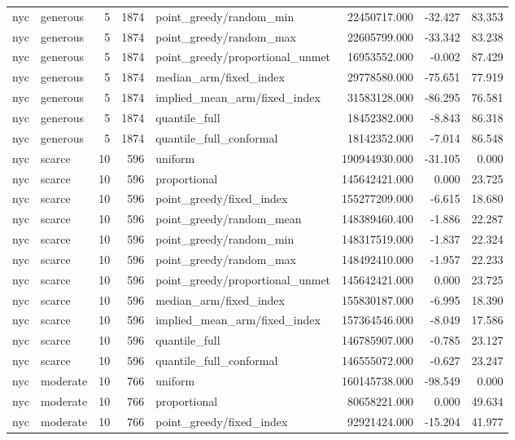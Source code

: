 \begin{tabular}{llrrlrrr}
nyc & generous & 5 & 1874 & point\_greedy/random\_min & 22450717.000 & -32.427 & 83.353 \\
nyc & generous & 5 & 1874 & point\_greedy/random\_max & 22605799.000 & -33.342 & 83.238 \\
nyc & generous & 5 & 1874 & point\_greedy/proportional\_unmet & 16953552.000 & -0.002 & 87.429 \\
nyc & generous & 5 & 1874 & median\_arm/fixed\_index & 29778580.000 & -75.651 & 77.919 \\
nyc & generous & 5 & 1874 & implied\_mean\_arm/fixed\_index & 31583128.000 & -86.295 & 76.581 \\
nyc & generous & 5 & 1874 & quantile\_full & 18452382.000 & -8.843 & 86.318 \\
nyc & generous & 5 & 1874 & quantile\_full\_conformal & 18142352.000 & -7.014 & 86.548 \\
nyc & scarce & 10 & 596 & uniform & 190944930.000 & -31.105 & 0.000 \\
nyc & scarce & 10 & 596 & proportional & 145642421.000 & 0.000 & 23.725 \\
nyc & scarce & 10 & 596 & point\_greedy/fixed\_index & 155277209.000 & -6.615 & 18.680 \\
nyc & scarce & 10 & 596 & point\_greedy/random\_mean & 148389460.400 & -1.886 & 22.287 \\
nyc & scarce & 10 & 596 & point\_greedy/random\_min & 148317519.000 & -1.837 & 22.324 \\
nyc & scarce & 10 & 596 & point\_greedy/random\_max & 148492410.000 & -1.957 & 22.233 \\
nyc & scarce & 10 & 596 & point\_greedy/proportional\_unmet & 145642421.000 & 0.000 & 23.725 \\
nyc & scarce & 10 & 596 & median\_arm/fixed\_index & 155830187.000 & -6.995 & 18.390 \\
nyc & scarce & 10 & 596 & implied\_mean\_arm/fixed\_index & 157364546.000 & -8.049 & 17.586 \\
nyc & scarce & 10 & 596 & quantile\_full & 146785907.000 & -0.785 & 23.127 \\
nyc & scarce & 10 & 596 & quantile\_full\_conformal & 146555072.000 & -0.627 & 23.247 \\
nyc & moderate & 10 & 766 & uniform & 160145738.000 & -98.549 & 0.000 \\
nyc & moderate & 10 & 766 & proportional & 80658221.000 & 0.000 & 49.634 \\
nyc & moderate & 10 & 766 & point\_greedy/fixed\_index & 92921424.000 & -15.204 & 41.977 \\

\end{tabular}
